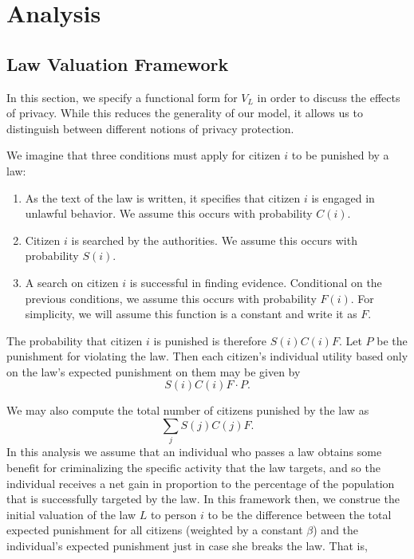 
\section{Analysis}
\label{sec:analysis}



\subsection{Law Valuation Framework}
In this section, we specify a functional form for $V_L$ in order to discuss the effects of privacy.  While this reduces the generality of our model, it allows us to distinguish between different notions of privacy protection.  

We imagine that three conditions must apply for citizen $i$ to be punished by a law:

\begin{enumerate}
\item As the text of the law is written, it specifies that citizen $i$ is engaged in unlawful behavior.  We assume this occurs with probability $C(i)$.
\item Citizen $i$ is searched by the authorities.  We assume this occurs with probability $S(i)$.
\item A search on citizen $i$ is successful in finding evidence.  Conditional on the previous conditions, we assume this occurs with probability $F(i)$.  For simplicity, we will assume this function is a constant and write it as $F$.
\end{enumerate}

The probability that citizen $i$ is punished is therefore $S(i)C(i)F$. 
Let $P$ be the punishment for violating the law. Then each citizen's individual utility based only on the law's expected punishment on them may be given by 
$$S(i)C(i)F\cdot P.$$

We may also compute the total number of citizens punished by the law as $$\sum_j S(j)C(j)F.$$  In this analysis we assume that an individual who passes a law obtains some benefit for criminalizing the specific activity that the law targets, and so the individual receives a net gain in proportion to the percentage of the population that is successfully targeted by the law.  In this framework then, we construe the initial valuation of the law $L$ to person $i$ to be the difference between the total expected punishment  for all citizens (weighted by a constant $\beta$) and the individual's expected punishment just in case she breaks the law. That is,  

